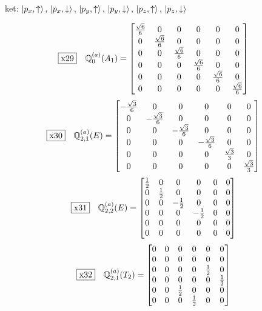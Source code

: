 \documentclass[fleqn,10pt,landscape]{jsarticle}
\begin{document}
\noindent\textbullet\, ket: $\ket{p_{x},\uparrow},\, \ket{p_{x},\downarrow},\, \ket{p_{y},\uparrow},\, \ket{p_{y},\downarrow},\, \ket{p_{z},\uparrow},\, \ket{p_{z},\downarrow}$

\begin{dmath*}
\fbox{x29}\quad \mathbb{Q}_{0}^{(a)}(A_{1})=\begin{bmatrix} \frac{\sqrt{6}}{6} & 0 & 0 & 0 & 0 & 0 \\ 0 & \frac{\sqrt{6}}{6} & 0 & 0 & 0 & 0 \\ 0 & 0 & \frac{\sqrt{6}}{6} & 0 & 0 & 0 \\ 0 & 0 & 0 & \frac{\sqrt{6}}{6} & 0 & 0 \\ 0 & 0 & 0 & 0 & \frac{\sqrt{6}}{6} & 0 \\ 0 & 0 & 0 & 0 & 0 & \frac{\sqrt{6}}{6} \end{bmatrix}
\end{dmath*}
\begin{dmath*}
\fbox{x30}\quad \mathbb{Q}_{2,1}^{(a)}(E)=\begin{bmatrix} - \frac{\sqrt{3}}{6} & 0 & 0 & 0 & 0 & 0 \\ 0 & - \frac{\sqrt{3}}{6} & 0 & 0 & 0 & 0 \\ 0 & 0 & - \frac{\sqrt{3}}{6} & 0 & 0 & 0 \\ 0 & 0 & 0 & - \frac{\sqrt{3}}{6} & 0 & 0 \\ 0 & 0 & 0 & 0 & \frac{\sqrt{3}}{3} & 0 \\ 0 & 0 & 0 & 0 & 0 & \frac{\sqrt{3}}{3} \end{bmatrix}
\end{dmath*}
\begin{dmath*}
\fbox{x31}\quad \mathbb{Q}_{2,2}^{(a)}(E)=\begin{bmatrix} \frac{1}{2} & 0 & 0 & 0 & 0 & 0 \\ 0 & \frac{1}{2} & 0 & 0 & 0 & 0 \\ 0 & 0 & - \frac{1}{2} & 0 & 0 & 0 \\ 0 & 0 & 0 & - \frac{1}{2} & 0 & 0 \\ 0 & 0 & 0 & 0 & 0 & 0 \\ 0 & 0 & 0 & 0 & 0 & 0 \end{bmatrix}
\end{dmath*}
\begin{dmath*}
\fbox{x32}\quad \mathbb{Q}_{2,1}^{(a)}(T_{2})=\begin{bmatrix} 0 & 0 & 0 & 0 & 0 & 0 \\ 0 & 0 & 0 & 0 & 0 & 0 \\ 0 & 0 & 0 & 0 & \frac{1}{2} & 0 \\ 0 & 0 & 0 & 0 & 0 & \frac{1}{2} \\ 0 & 0 & \frac{1}{2} & 0 & 0 & 0 \\ 0 & 0 & 0 & \frac{1}{2} & 0 & 0 \end{bmatrix}
\end{dmath*}
\end{document}
